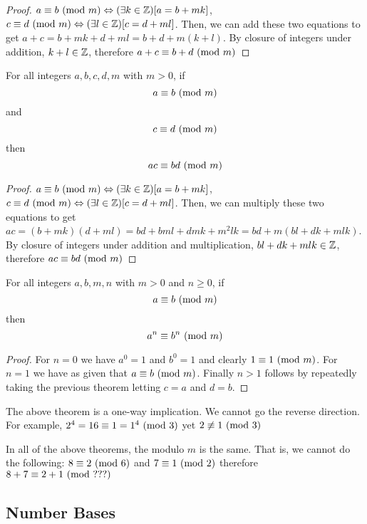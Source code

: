 \documentclass[main.tex]{subfiles}
\begin{document}
\begin{proof}
	\(a \equiv b \ (\mathrm{mod}\ m) \Leftrightarrow (\exists k \in \mathbb{Z})[a = b + mk]\), \(c \equiv d \ (\mathrm{mod}\ m) \Leftrightarrow (\exists l \in \mathbb{Z})[c = d + ml]\). Then, we can add these two equations to get \(a+c = b + mk + d + ml = b+d + m(k+l)\). By closure of integers under addition, \(k+l \in \mathbb{Z}\), therefore \(a+c \equiv b+d \ (\mathrm{mod}\ m)\)
\end{proof}

\begin{thm}
	For all integers \(a,b,c,d,m\) with \(m > 0\), if \[a \equiv b \ (\mathrm{mod}\ m)\] and \[c \equiv d \ (\mathrm{mod}\ m)\] then \[ac \equiv bd \ (\mathrm{mod}\ m)\]
\end{thm}

\begin{proof}
	\(a \equiv b \ (\mathrm{mod}\ m) \Leftrightarrow (\exists k \in \mathbb{Z})[a = b + mk]\), \(c \equiv d \ (\mathrm{mod}\ m) \Leftrightarrow (\exists l \in \mathbb{Z})[c = d + ml]\). Then, we can multiply these two equations to get \(ac = (b + mk)(d + ml) = bd + bml + dmk + m^2lk = bd + m(bl + dk + mlk)\). By closure of integers under addition and multiplication, \(bl + dk + mlk \in \mathbb{Z}\), therefore \(ac \equiv bd \ (\mathrm{mod}\ m)\)
\end{proof}

\begin{thm}
	For all integers \(a,b,m,n\) with \(m > 0\) and \(n \geq 0\), if \[a \equiv b \ (\mathrm{mod}\ m)\] then \[a^n \equiv b^n \ (\mathrm{mod}\ m)\]
\end{thm}

\begin{proof}
	For \(n = 0\) we have \(a^0 = 1\) and \(b^0 = 1\) and clearly \(1 \equiv 1 \ (\mathrm{mod}\ m)\). For \(n = 1\) we have as given that \(a \equiv b \ (\mathrm{mod}\ m)\). Finally \(n > 1\) follows by repeatedly taking the previous theorem letting \(c = a\) and \(d = b\).
\end{proof}

\begin{rem}
	The above theorem is a one-way implication. We cannot go the reverse direction. For example, \(2^4 = 16 \equiv 1 = 1^4 \ (\mathrm{mod}\ 3)\) yet \(2 \not\equiv 1 \ (\mathrm{mod}\ 3)\)
\end{rem}

\begin{rem}
	In all of the above theorems, the modulo \(m\) is the same. That is, we cannot do the following: \(8 \equiv 2 \ (\mathrm{mod}\ 6)\) and \(7 \equiv 1 \ (\mathrm{mod}\ 2)\) therefore \(8+7 \equiv 2+1 \ (\mathrm{mod}\ ???)\)
\end{rem}

\subsection{Number Bases}
\label{diff-num-bases}
\end{document}
